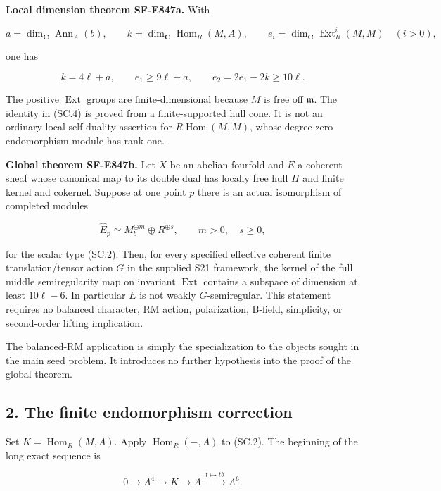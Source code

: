 \textbf{Local dimension theorem SF-E847a.} With

\[
 a=\dim_{\mathbf C}\operatorname{Ann}_A(b),\qquad
 k=\dim_{\mathbf C}\operatorname{Hom}_R(M,A),\qquad
 e_i=\dim_{\mathbf C}\operatorname{Ext}^i_R(M,M)\quad(i>0),
 \tag{SC.3}
\]

one has

\[
 k=4\ell+a,\qquad e_1\ge9\ell+a,\qquad
 e_2=2e_1-2k\ge10\ell.
 \tag{SC.4}
\]

The positive \(\operatorname{Ext}\) groups are finite-dimensional because \(M\) is free off \(\mathfrak m\).
The identity in (SC.4) is proved from a finite-supported hull cone.
It is not an ordinary local self-duality assertion for \(R\operatorname{Hom}(M,M)\),
whose degree-zero endomorphism module has rank one.

\textbf{Global theorem SF-E847b.} Let \(X\) be an abelian fourfold and \(E\) a coherent
sheaf whose canonical map to its double dual has locally free hull \(H\)
and finite kernel and cokernel. Suppose at one point \(p\) there is an
actual isomorphism of completed modules

\[
 \widehat E_p\simeq M_b^{\oplus m}\oplus R^{\oplus s},
 \qquad m>0,\quad s\ge0,
 \tag{SC.5}
\]

for the scalar type (SC.2). Then, for every specified effective coherent
finite translation/tensor action \(G\) in the supplied S21 framework, the
kernel of the full middle semiregularity map on invariant \(\operatorname{Ext}\) contains
a subspace of dimension at least \(10\ell-6\). In particular \(E\) is not weakly
\(G\)-semiregular. This statement requires no balanced character, RM action,
polarization, B-field, simplicity, or second-order lifting implication.

The balanced-RM application is simply the specialization to the objects
sought in the main seed problem. It introduces no further hypothesis
into the proof of the global theorem.

\subsection{2. The finite endomorphism correction}\label{SF-E847:s2}

Set \(K=\operatorname{Hom}_R(M,A)\). Apply \(\operatorname{Hom}_R(-,A)\) to (SC.2). The beginning of the
long exact sequence is

\[
 0\longrightarrow A^4\longrightarrow K\longrightarrow A
        \xrightarrow{\ t\mapsto tb\ } A^6.
 \tag{SC.6}
\]

